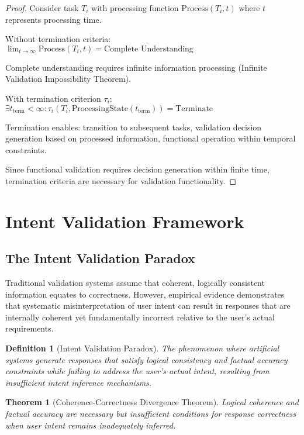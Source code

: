 \documentclass[12pt,a4paper]{article}
\newtheorem{theorem}{Theorem}
\newtheorem{definition}{Definition}
\begin{document}
\begin{proof}
Consider task $T_i$ with processing function $\text{Process}(T_i, t)$ where $t$ represents processing time.

Without termination criteria: $\lim_{t \to \infty} \text{Process}(T_i, t) = \text{Complete Understanding}$

Complete understanding requires infinite information processing (Infinite Validation Impossibility Theorem).

With termination criterion $\tau_i$: $\exists t_{\text{term}} < \infty : \tau_i(T_i, \text{ProcessingState}(t_{\text{term}})) = \text{Terminate}$

Termination enables: transition to subsequent tasks, validation decision generation based on processed information, functional operation within temporal constraints.

Since functional validation requires decision generation within finite time, termination criteria are necessary for validation functionality.
\end{proof}

\section{Intent Validation Framework}

\subsection{The Intent Validation Paradox}

Traditional validation systems assume that coherent, logically consistent information equates to correctness. However, empirical evidence demonstrates that systematic misinterpretation of user intent can result in responses that are internally coherent yet fundamentally incorrect relative to the user's actual requirements.

\begin{definition}[Intent Validation Paradox]
The phenomenon where artificial systems generate responses that satisfy logical consistency and factual accuracy constraints while failing to address the user's actual intent, resulting from insufficient intent inference mechanisms.
\end{definition}

\begin{theorem}[Coherence-Correctness Divergence Theorem]
Logical coherence and factual accuracy are necessary but insufficient conditions for response correctness when user intent remains inadequately inferred.
\end{theorem}
\end{document}
